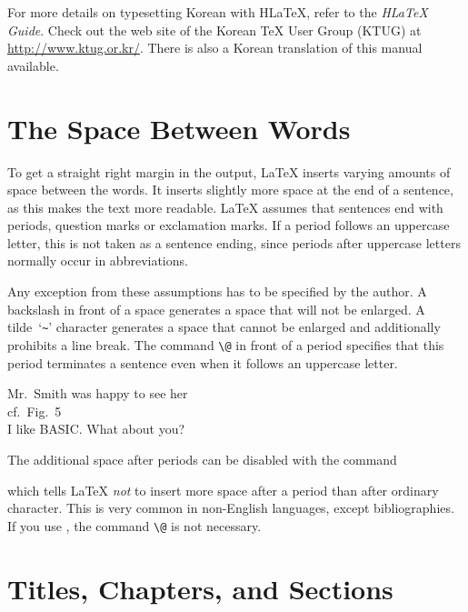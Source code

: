 For more details on typesetting  Korean with H\LaTeX{}, refer to
the \emph{H\LaTeX{} Guide}.  Check out the web site of the Korean
\TeX{} User Group (KTUG) at  \url{http://www.ktug.or.kr/}.
There is also a Korean translation
of this manual available.

\fi

\section{The Space Between Words}

To get a straight right margin in the output, \LaTeX{} inserts varying
amounts of space between the words. It inserts slightly more space at
the end of a sentence, as this makes the text more readable.  \LaTeX{}
assumes that sentences end with periods, question marks or exclamation
marks. If a period follows an uppercase letter, this is not taken as a
sentence ending, since periods after uppercase letters normally occur in
abbreviations.

Any exception from these assumptions has to be specified by the
author. A backslash in front of a space generates a space that will
not be enlarged. A tilde~`\verb|~|' character generates a space that cannot be
enlarged and additionally prohibits a line break. The command
\verb|\@| in front of a period specifies that this period terminates a
sentence even when it follows an uppercase letter.
  

\begin{example}
Mr.~Smith was happy to see her\\
cf.~Fig.~5\\
I like BASIC\@. What about you?
\end{example}

The additional space after periods can be disabled with the command
\begin{lscommand}
\end{lscommand}
\noindent which tells \LaTeX{} \emph{not} to insert more space after a
period than after ordinary character. This is very common in
non-English languages, except bibliographies. If you use
, the command \verb|\@| is not necessary.

\newpage    
\section{Titles, Chapters, and Sections}

